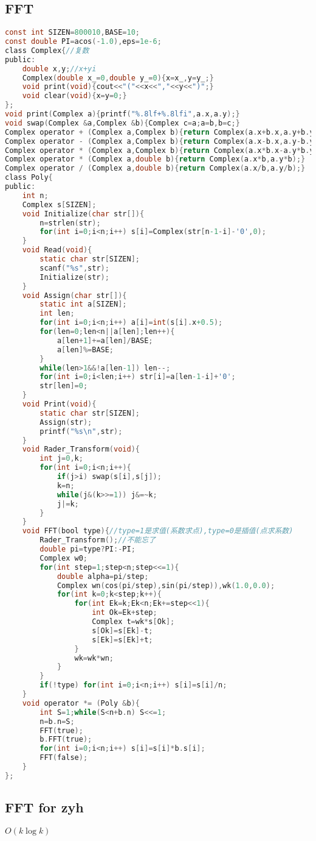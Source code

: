 \subsection{FFT}
\begin{lstlisting}[language=C]
const int SIZEN=800010,BASE=10;
const double PI=acos(-1.0),eps=1e-6;
class Complex{//复数
public:
	double x,y;//x+yi
	Complex(double x_=0,double y_=0){x=x_,y=y_;}
	void print(void){cout<<"("<<x<<","<<y<<")";}
	void clear(void){x=y=0;}
};
void print(Complex a){printf("%.8lf+%.8lfi",a.x,a.y);}
void swap(Complex &a,Complex &b){Complex c=a;a=b,b=c;}
Complex operator + (Complex a,Complex b){return Complex(a.x+b.x,a.y+b.y);}
Complex operator - (Complex a,Complex b){return Complex(a.x-b.x,a.y-b.y);}
Complex operator * (Complex a,Complex b){return Complex(a.x*b.x-a.y*b.y,a.x*b.y+b.x*a.y);}
Complex operator * (Complex a,double b){return Complex(a.x*b,a.y*b);}
Complex operator / (Complex a,double b){return Complex(a.x/b,a.y/b);}
class Poly{
public:
	int n;
	Complex s[SIZEN];
	void Initialize(char str[]){
		n=strlen(str);
		for(int i=0;i<n;i++) s[i]=Complex(str[n-1-i]-'0',0);
	}
	void Read(void){
		static char str[SIZEN];
		scanf("%s",str);
		Initialize(str);
	}
	void Assign(char str[]){
		static int a[SIZEN];
		int len;
		for(int i=0;i<n;i++) a[i]=int(s[i].x+0.5);
		for(len=0;len<n||a[len];len++){
			a[len+1]+=a[len]/BASE;
			a[len]%=BASE;
		}
		while(len>1&&!a[len-1]) len--;
		for(int i=0;i<len;i++) str[i]=a[len-1-i]+'0';
		str[len]=0;
	}
	void Print(void){
		static char str[SIZEN];
		Assign(str);
		printf("%s\n",str);
	}
	void Rader_Transform(void){
		int j=0,k;
		for(int i=0;i<n;i++){
			if(j>i) swap(s[i],s[j]);
			k=n;
			while(j&(k>>=1)) j&=~k;
			j|=k;
		}
	}
	void FFT(bool type){//type=1是求值(系数求点),type=0是插值(点求系数)
		Rader_Transform();//不能忘了
		double pi=type?PI:-PI;
		Complex w0;
		for(int step=1;step<n;step<<=1){
			double alpha=pi/step;
			Complex wn(cos(pi/step),sin(pi/step)),wk(1.0,0.0);
			for(int k=0;k<step;k++){
				for(int Ek=k;Ek<n;Ek+=step<<1){
					int Ok=Ek+step;
					Complex t=wk*s[Ok];
					s[Ok]=s[Ek]-t;
					s[Ek]=s[Ek]+t;
				}
				wk=wk*wn;
			}
		}
		if(!type) for(int i=0;i<n;i++) s[i]=s[i]/n;
	}
	void operator *= (Poly &b){
		int S=1;while(S<n+b.n) S<<=1;
		n=b.n=S;
		FFT(true);
		b.FFT(true);
		for(int i=0;i<n;i++) s[i]=s[i]*b.s[i];
		FFT(false);
	}
};
\end{lstlisting}
\subsection{FFT for zyh}
$O(k \log k)$

